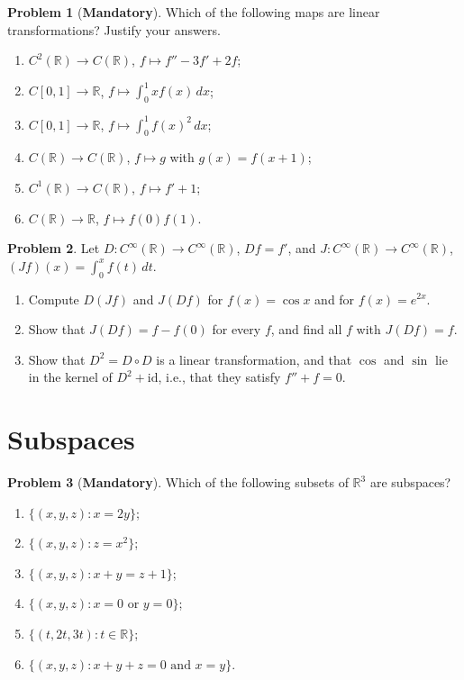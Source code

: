 \documentclass[11pt]{article}
\theoremstyle{definition}
\newtheorem{problem}{Problem}[section]
\newcommand{\mandatory}{\textcolor{red!70!black}{\textbf{Mandatory}}}
\begin{document}
\begin{problem}[\mandatory]\label{pr:calculus-maps}
    Which of the following maps are linear transformations? Justify your answers.
    \begin{enumerate}[label=(\alph*)]
        \item $C^2(\mathbb{R}) \to C(\mathbb{R})$, $f \mapsto f'' - 3f' + 2f$;
        \item $C[0, 1] \to \mathbb{R}$, $f \mapsto \int_0^1 x f(x)\, dx$;
        \item $C[0, 1] \to \mathbb{R}$, $f \mapsto \int_0^1 f(x)^2\, dx$;
        \item $C(\mathbb{R}) \to C(\mathbb{R})$, $f \mapsto g$ with $g(x) = f(x + 1)$;
        \item $C^1(\mathbb{R}) \to C(\mathbb{R})$, $f \mapsto f' + 1$;
        \item $C(\mathbb{R}) \to \mathbb{R}$, $f \mapsto f(0)f(1)$.
    \end{enumerate}
\end{problem}

\begin{problem}\label{pr:diff-int}
    Let $D: C^\infty(\mathbb{R}) \to C^\infty(\mathbb{R})$, $Df = f'$, and $J: C^\infty(\mathbb{R}) \to C^\infty(\mathbb{R})$, $(Jf)(x) = \int_0^x f(t)\, dt$.
    \begin{enumerate}[label=(\alph*)]
        \item Compute $D(Jf)$ and $J(Df)$ for $f(x) = \cos x$ and for $f(x) = e^{2x}$.
        \item Show that $J(Df) = f - f(0)$ for every $f$, and find all $f$ with $J(Df) = f$.
        \item Show that $D^2 = D \circ D$ is a linear transformation, and that $\cos$ and $\sin$ lie in the kernel of $D^2 + \mathrm{id}$, i.e., that they satisfy $f'' + f = 0$.
    \end{enumerate}
\end{problem}

\section{Subspaces}

\begin{problem}[\mandatory]\label{pr:subspaces}
    Which of the following subsets of $\mathbb{R}^3$ are subspaces?
    \begin{enumerate}[label=(\alph*)]
        \item $\{(x, y, z) : x = 2y\}$;
        \item $\{(x, y, z) : z = x^2\}$;
        \item $\{(x, y, z) : x + y = z + 1\}$;
        \item $\{(x, y, z) : x = 0 \text{ or } y = 0\}$;
        \item $\{(t, 2t, 3t) : t \in \mathbb{R}\}$;
        \item $\{(x, y, z) : x + y + z = 0 \text{ and } x = y\}$.
    \end{enumerate}
\end{problem}
\end{document}
